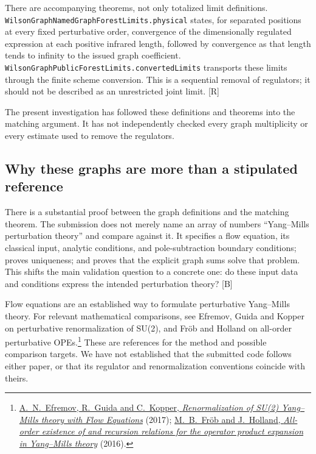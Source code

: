 \documentclass[11pt]{article}
\newcommand{\code}[1]{{\small\nolinkurl{#1}}}
\newcommand{\src}[1]{\textsf{[#1]}}
\begin{document}
There are accompanying theorems, not only totalized limit definitions.
\code{WilsonGraphNamedGraphForestLimits.physical} states, for separated
positions at every fixed perturbative order, convergence of the
dimensionally regulated expression at each positive infrared length,
followed by convergence as that length tends to infinity to the issued
graph coefficient. \code{WilsonGraphPublicForestLimits.convertedLimits}
transports these limits through the finite scheme conversion.
This is a sequential removal of regulators; it should not be described
as an unrestricted joint limit. \src{R}

The present investigation has followed these definitions and theorems
into the matching argument. It has not independently checked every
graph multiplicity or every estimate used to remove the regulators.

\subsection{Why these graphs are more than a stipulated reference}
\label{sec:graph-audit}

There is a substantial proof between the graph definitions and the
matching theorem. The submission does not merely name an array of
numbers ``Yang--Mills perturbation theory'' and compare against it.
It specifies a flow equation, its classical input, analytic conditions,
and pole-subtraction boundary conditions; proves uniqueness; and proves
that the explicit graph sums solve that problem. This shifts the main
validation question to a concrete one: do these input data and conditions
express the intended perturbation theory? \src{B}

Flow equations are an established way to formulate perturbative
Yang--Mills theory. For relevant mathematical comparisons, see
Efremov, Guida and Kopper on perturbative renormalization of SU(2),
and Fr\"ob and Holland on all-order perturbative OPEs.\footnote{
\href{https://arxiv.org/abs/1704.06799}{A.~N.~Efremov, R.~Guida and C.~Kopper,
\emph{Renormalization of SU(2) Yang--Mills theory with Flow Equations}}
(2017);
\href{https://arxiv.org/abs/1603.08012}{M.~B.~Fr\"ob and J.~Holland,
\emph{All-order existence of and recursion relations for the operator
product expansion in Yang--Mills theory}} (2016).}
These are references for the method and possible comparison targets.
We have not established that the submitted code follows either paper,
or that its regulator and renormalization conventions coincide with theirs.
\end{document}
